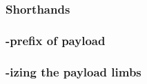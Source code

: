 \subsubsection{Shorthands                     } \label{rlp txn v2: phase constraints: payload: shorthands}            
\subsubsection{\rlp{}-prefix of payload       } \label{rlp txn v2: phase constraints: payload: payload size analysis} 
\subsubsection{\rlp{}-izing the payload limbs } \label{rlp txn v2: phase constraints: payload: limb content analysis} 
